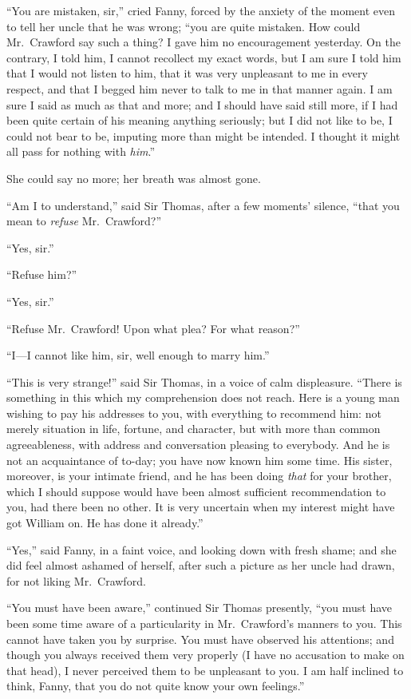 ``You are mistaken, sir,'' cried Fanny, forced by the anxiety
of the moment even to tell her uncle that he was wrong;
``you are quite mistaken.  How could Mr.\ Crawford say
such a thing?  I gave him no encouragement yesterday.
On the contrary, I told him, I cannot recollect my exact words,
but I am sure I told him that I would not listen to him,
that it was very unpleasant to me in every respect, and that
I begged him never to talk to me in that manner again.
I am sure I said as much as that and more; and I should
have said still more, if I had been quite certain of his
meaning anything seriously; but I did not like to be,
I could not bear to be, imputing more than might be intended.
I thought it might all pass for nothing with \emph{him}.''

She could say no more; her breath was almost gone.

``Am I to understand,'' said Sir Thomas, after a few moments'
silence, ``that you mean to \emph{refuse} Mr.\ Crawford?''

``Yes, sir.''

``Refuse him?''

``Yes, sir.''

``Refuse Mr.\ Crawford!  Upon what plea?  For what reason?''

``I---I cannot like him, sir, well enough to marry him.''

``This is very strange!'' said Sir Thomas, in a voice of
calm displeasure.  ``There is something in this which my
comprehension does not reach.  Here is a young man wishing
to pay his addresses to you, with everything to recommend him:
not merely situation in life, fortune, and character,
but with more than common agreeableness, with address
and conversation pleasing to everybody.  And he is not an
acquaintance of to-day; you have now known him some time.
His sister, moreover, is your intimate friend, and he has
been doing \emph{that} for your brother, which I should suppose
would have been almost sufficient recommendation to you,
had there been no other.  It is very uncertain when my
interest might have got William on.  He has done it already.''

``Yes,'' said Fanny, in a faint voice, and looking down
with fresh shame; and she did feel almost ashamed
of herself, after such a picture as her uncle had drawn,
for not liking Mr.\ Crawford.

``You must have been aware,'' continued Sir Thomas presently,
``you must have been some time aware of a particularity
in Mr.\ Crawford's manners to you.  This cannot have taken
you by surprise.  You must have observed his attentions;
and though you always received them very properly (I have
no accusation to make on that head), I never perceived them
to be unpleasant to you.  I am half inclined to think,
Fanny, that you do not quite know your own feelings.''


